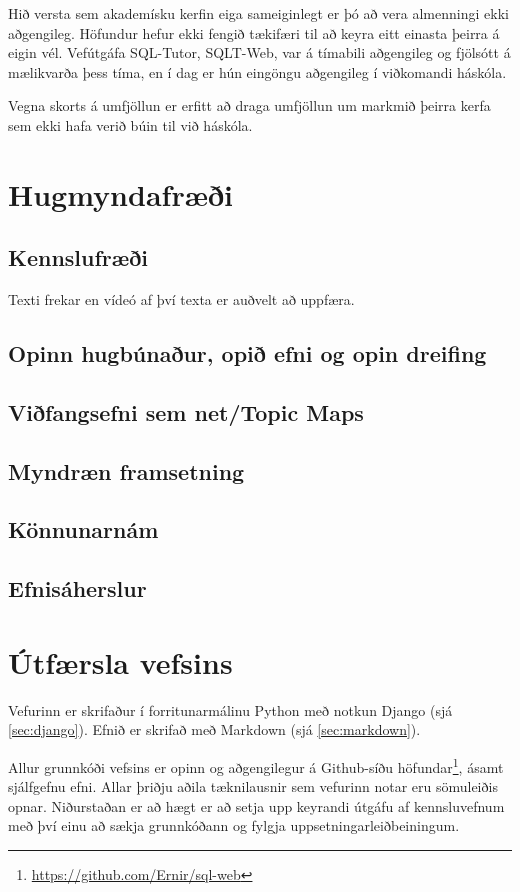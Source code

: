 \documentclass[a4paper,12pt,twoside,BCOR=10mm]{scrbook}
\begin{document}
Hið versta sem akademísku kerfin eiga sameiginlegt er þó að vera almenningi ekki aðgengileg. Höfundur hefur ekki fengið tækifæri til að keyra eitt einasta þeirra á eigin vél. Vefútgáfa SQL-Tutor, SQLT-Web, var á tímabili aðgengileg og fjölsótt á mælikvarða þess tíma\cite{mitrovic2003intelligent}, en í dag er hún eingöngu aðgengileg í viðkomandi háskóla.

Vegna skorts á umfjöllun er erfitt að draga umfjöllun um markmið þeirra kerfa sem ekki hafa verið búin til við háskóla. 
\chapter{Hugmyndafræði}
\section{Kennslufræði}
\label{sec:kennslufraedilegar-hugmyndir}
Texti frekar en vídeó af því texta er auðvelt að uppfæra.
\section{Opinn hugbúnaður, opið efni og opin dreifing}
\section{Viðfangsefni sem net/Topic Maps}
\section{Myndræn framsetning}
\section{Könnunarnám}
\section{Efnisáherslur}
\chapter{Útfærsla vefsins}
Vefurinn er skrifaður í forritunarmálinu Python með notkun Django (sjá \ref{sec:django}). Efnið er skrifað með Markdown (sjá \ref{sec:markdown}).

Allur grunnkóði vefsins er opinn og aðgengilegur á Github-síðu höfundar\footnote{\url{https://github.com/Ernir/sql-web}}, ásamt sjálfgefnu efni. Allar þriðju aðila tæknilausnir sem vefurinn notar eru sömuleiðis opnar. Niðurstaðan er að hægt er að setja upp keyrandi útgáfu af kennsluvefnum með því einu að sækja grunnkóðann og fylgja uppsetningarleiðbeiningum. %
\end{document}
